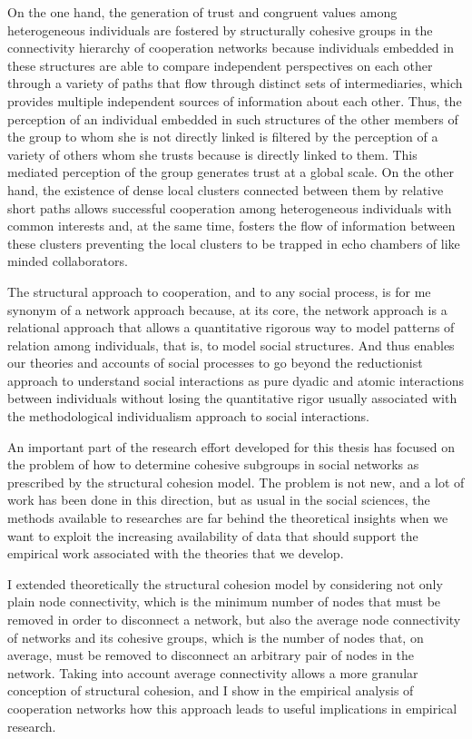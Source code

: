 On the one hand, the generation of trust and congruent values among heterogeneous individuals are fostered by structurally cohesive groups in the connectivity hierarchy of cooperation networks because individuals embedded in these structures are able to compare independent perspectives on each other through a variety of paths that flow through distinct sets of intermediaries, which provides multiple independent sources of information about each other. Thus, the perception of an individual embedded in such structures of the other members of the group to whom she is not directly linked is filtered by the perception of a variety of others whom she trusts because is directly linked to them. This mediated perception of the group generates trust at a global scale. On the other hand, the existence of dense local clusters connected between them by relative short paths allows successful cooperation among heterogeneous individuals with common interests and, at the same time, fosters the flow of information between these clusters preventing the local clusters to be trapped in echo chambers of like minded collaborators.

The structural approach to cooperation, and to any social process, is for me synonym of a network approach because, at its core, the network approach is a relational approach that allows a quantitative rigorous way to model patterns of relation among individuals, that is, to model social structures. And thus enables our theories and accounts of social processes to go beyond the reductionist approach to understand social interactions as pure dyadic and atomic interactions between individuals without losing the quantitative rigor usually associated with the methodological individualism approach to social interactions.

An important part of the research effort developed for this thesis has focused on the problem of how to determine cohesive subgroups in social networks as prescribed by the structural cohesion model. The problem is not new, and a lot of work has been done in this direction, but as usual in the social sciences, the methods available to researches are far behind the theoretical insights when we want to exploit the increasing availability of data that should support the empirical work associated with the theories that we develop.

I extended theoretically the structural cohesion model by considering not only plain node connectivity, which is the minimum number of nodes that must be removed in order to disconnect a network, but also the average node connectivity of networks and its cohesive groups, which is the number of nodes that, on average, must be removed to disconnect an arbitrary pair of nodes in the network. Taking into account average connectivity allows a more granular conception of structural cohesion, and I show in the empirical analysis of cooperation networks how this approach leads to useful implications in empirical research.

